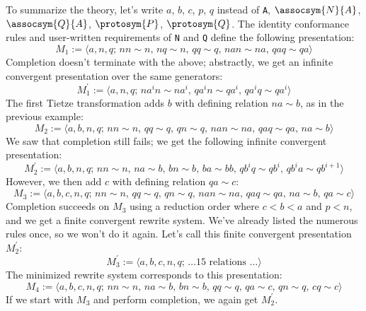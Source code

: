 \documentclass[../generics]{subfiles}
\begin{document}
\begin{example}
\smallskip

To summarize the theory, let's write $a$, $b$, $c$, $p$, $q$ instead of \texttt{A}, $\assocsym{N}{A}$, $\assocsym{Q}{A}$, $\protosym{P}$, $\protosym{Q}$. The identity conformance rules and user-written requirements of \texttt{N} and \texttt{Q} define the following presentation:
\[M_1 := \langle a,n,q;\,nn\sim n,\, nq\sim n,\, qq\sim q,\,nan\sim na,\,qaq\sim qa\rangle\]
Completion doesn't terminate with the above; abstractly, we get an infinite convergent presentation over the same generators:
\[M_1^\prime := \langle a,n,q;\,na^in\sim na^i,\, qa^in\sim qa^i,\,qa^iq\sim qa^i\rangle\]
The first Tietze transformation adds $b$ with defining relation $na\sim b$, as in the previous example:
\[M_2 := \langle a,b,n,q;\,nn\sim n,\, qq\sim q,\, qn\sim q,\, nan\sim na,\,qaq\sim qa,\,na\sim b\rangle\]
We saw that completion still fails; we get the following infinite convergent presentation:
\[M_2^{\prime} := \langle a,b,n,q;\,nn\sim n,\,na\sim b,\,bn\sim b,\,ba\sim bb,\,qb^iq\sim qb^i,\, qb^ia\sim qb^{i+1}\rangle\]
However, we then add $c$ with defining relation $qa\sim c$:
\[M_3 := \langle a,b,c,n,q;\,nn\sim n,\, qq\sim q,\, qn\sim q,\, nan\sim na,\,qaq\sim qa,\,na\sim b,\,qa\sim c\rangle\]
Completion succeeds on $M_3$ using a reduction order where $c<b<a$ and $p<n$, and we get a finite convergent rewrite system. We've already listed the numerous rules once, so we won't do it again. Let's call this finite convergent presentation $M_2^\prime$:
\[M_3^\prime := \langle a,b,c,n,q;\,\mbox{\ldots 15 relations \ldots}\rangle\]
The minimized rewrite system corresponds to this presentation:
\[M_4 :=\langle a,b,c,n,q;\,nn\sim n,\, na\sim b,\, bn\sim b,\, qq\sim q,\, qa\sim c,\, qn\sim q,\, cq\sim c\rangle\]
If we start with $M_3$ and perform completion, we again get $M_2^\prime$.
\end{example}
\end{document}
